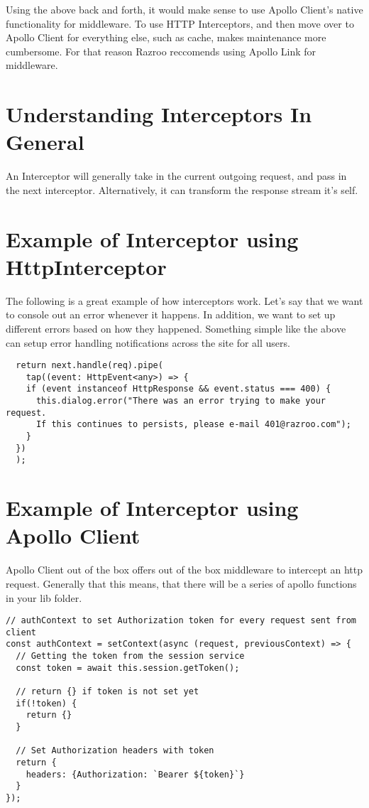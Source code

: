 Using the above back and forth, it would make sense to use Apollo Client's 
native functionality for middleware. To use HTTP Interceptors, and then 
move over to Apollo Client for everything else, such as cache, makes 
maintenance more cumbersome. For that reason Razroo reccomends using Apollo
Link for middleware.

\section{Understanding Interceptors In General}
An Interceptor will generally take in the current outgoing request, and pass 
in the next interceptor. Alternatively, it can transform the response stream 
it's self. 

\section{Example of Interceptor using HttpInterceptor}

The following is a great example of how interceptors work. Let's say that we
want to console out an error whenever it happens. In addition, we want to 
set up different errors based on how they happened. Something simple like 
the above can setup error handling notifications across the site for all users.  
\begin{lstlisting}
  return next.handle(req).pipe(
    tap((event: HttpEvent<any>) => {
    if (event instanceof HttpResponse && event.status === 400) {
      this.dialog.error("There was an error trying to make your request. 
      If this continues to persists, please e-mail 401@razroo.com");
    }
  })
  );
\end{lstlisting}

\section{Example of Interceptor using Apollo Client}
Apollo Client out of the box offers out of the box middleware to intercept an
http request. Generally that this means, that there will be a series of 
apollo functions in your lib folder. 

\begin{lstlisting}
// authContext to set Authorization token for every request sent from client
const authContext = setContext(async (request, previousContext) => {
  // Getting the token from the session service
  const token = await this.session.getToken();

  // return {} if token is not set yet
  if(!token) {
    return {}
  }

  // Set Authorization headers with token
  return {
    headers: {Authorization: `Bearer ${token}`}
  }
});
\end{lstlisting}


